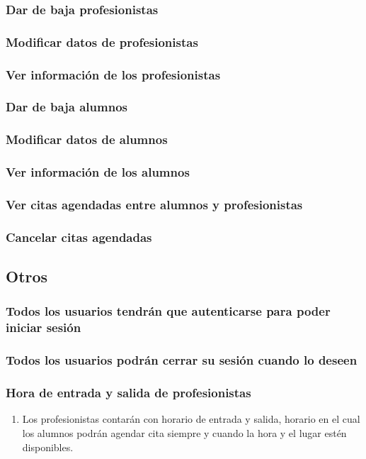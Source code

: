 \documentclass[11pt]{article}
\begin{document}
\subsubsection{Dar de baja profesionistas}
\label{sec-2-3-2}
\subsubsection{Modificar datos de profesionistas}
\label{sec-2-3-3}
\subsubsection{Ver información de los profesionistas}
\label{sec-2-3-4}
\subsubsection{Dar de baja alumnos}
\label{sec-2-3-5}
\subsubsection{Modificar datos de alumnos}
\label{sec-2-3-6}
\subsubsection{Ver información de los alumnos}
\label{sec-2-3-7}
\subsubsection{Ver citas agendadas entre alumnos y profesionistas}
\label{sec-2-3-8}
\subsubsection{Cancelar citas agendadas}
\label{sec-2-3-9}
\subsection{Otros}
\label{sec-2-4}
\subsubsection{Todos los usuarios tendrán que autenticarse para poder iniciar sesión}
\label{sec-2-4-1}
\subsubsection{Todos los usuarios podrán cerrar su sesión cuando lo deseen}
\label{sec-2-4-2}
\subsubsection{Hora de entrada y salida de profesionistas}
\label{sec-2-4-3}
\begin{enumerate}
\item Los profesionistas contarán con horario de entrada y salida, horario
\label{sec-2-4-3-1}
en el cual los alumnos podrán agendar cita siempre y cuando la hora y el lugar
estén disponibles.
\end{enumerate}
\end{document}
